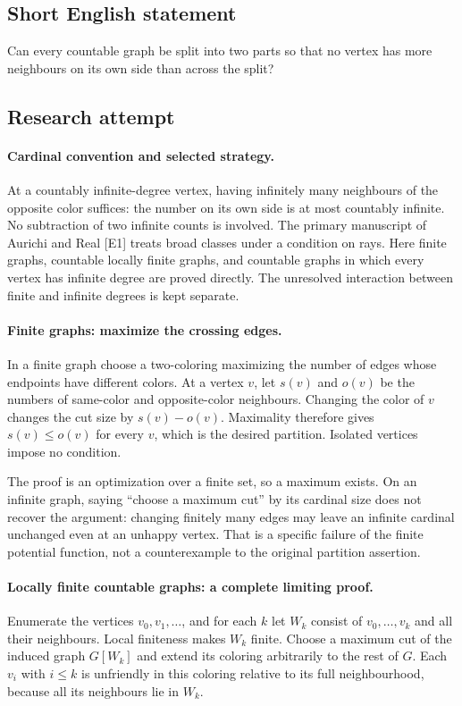 \documentclass[11pt,a4paper]{article}
\begin{document}
\subsection{Short English statement}

Can every countable graph be split into two parts so that no vertex has more neighbours on its own side than across the split?

\subsection{Research attempt}

\paragraph{Cardinal convention and selected strategy.}
At a countably infinite-degree vertex, having infinitely many neighbours
of the opposite color suffices: the number on its own side is at most
countably infinite. No subtraction of two infinite counts is involved.
The primary manuscript of Aurichi and Real [E1] treats broad classes
under a condition on rays. Here finite graphs, countable locally finite
graphs, and countable graphs in which every vertex has infinite degree
are proved directly. The unresolved interaction between finite and
infinite degrees is kept separate.

\paragraph{Finite graphs: maximize the crossing edges.}
In a finite graph choose a two-coloring maximizing the number of edges
whose endpoints have different colors. At a vertex $v$, let $s(v)$
and $o(v)$ be the numbers of same-color and opposite-color neighbours.
Changing the color of $v$ changes the cut size by $s(v)-o(v)$.
Maximality therefore gives $s(v)\le o(v)$ for every $v$, which is
the desired partition. Isolated vertices impose no condition.

The proof is an optimization over a finite set, so a maximum exists.
On an infinite graph, saying ``choose a maximum cut'' by its cardinal
size does not recover the argument: changing finitely many edges may
leave an infinite cardinal unchanged even at an unhappy vertex.
That is a specific failure of the finite potential function, not a
counterexample to the original partition assertion.

\paragraph{Locally finite countable graphs: a complete limiting proof.}
Enumerate the vertices $v_0,v_1,\ldots$, and for each $k$ let
$W_k$ consist of $v_0,\ldots,v_k$ and all their neighbours. Local
finiteness makes $W_k$ finite. Choose a maximum cut of the induced
graph $G[W_k]$ and extend its coloring arbitrarily to the rest of
$G$. Each $v_i$ with $i\le k$ is unfriendly in this coloring relative
to its full neighbourhood, because all its neighbours lie in $W_k$.
\end{document}
